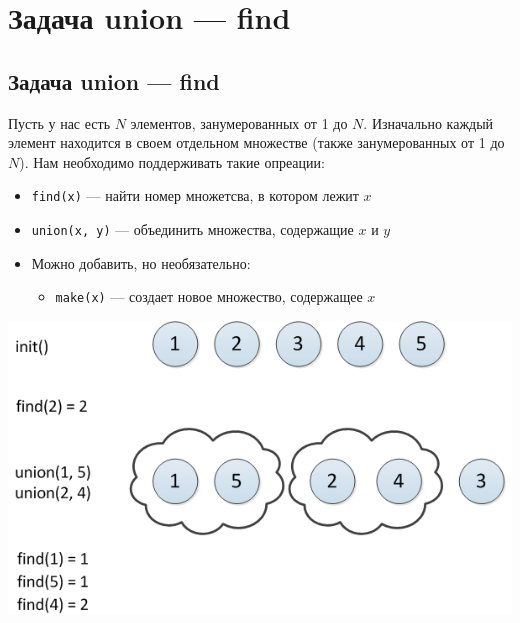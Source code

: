 \documentclass[a4paper]{article}
\newcommand{\code}[1]{\colorbox{codegray}{\texttt{#1}}}
\begin{document}
\section{Задача union — find}
\subsection{Задача union — find}
Пусть у нас есть $N$ элементов, занумерованных от 1 до $N$. Изначально каждый элемент находится в своем отдельном множестве (также занумерованных от 1 до $N$). Нам необходимо поддерживать такие опреации:
\begin{itemize}
    \item \code{find(x)} — найти номер множетсва, в котором лежит $x$
    \item \code{union(x, y)} — объединить множества, содержащие $x$ и $y$
    \item Можно добавить, но необязательно:
    \begin{itemize}
        \item \code{make(x)} — создает новое множество, содержащее $x$ 
    \end{itemize}
\end{itemize}
\begin{center}
    \includegraphics[width=0.6\linewidth]{DSU_1_Example.png}
    \label{union-find}
\end{center}
\end{document}
